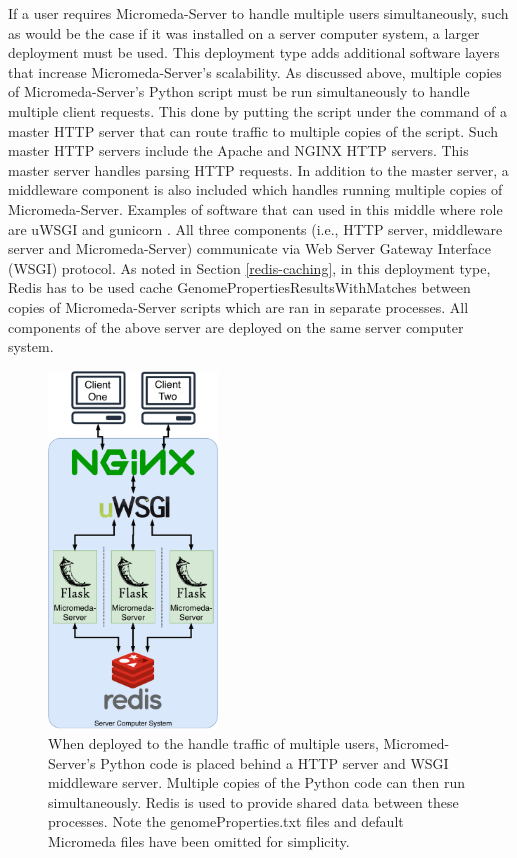 If a user requires Micromeda-Server to handle multiple users simultaneously, such as would be the case if it was installed on a server computer system, a larger deployment must be used. This deployment type adds additional software layers that increase Micromeda-Server's scalability. As discussed above, multiple copies of Micromeda-Server's Python script must be run simultaneously to handle multiple client requests. This done by putting the script under the command of a master HTTP server that can route traffic to multiple copies of the script. Such master HTTP servers include the Apache \cite{fielding1997apache} and NGINX \cite{reese2008nginx} HTTP servers. This master server handles parsing HTTP requests. In addition to the master server, a middleware component is also included which handles running multiple copies of Micromeda-Server. Examples of software that can used in this middle where role are uWSGI \cite{2019uwsgi} and gunicorn \cite{chesneau_2018}. All three components (i.e., HTTP server, middleware server and Micromeda-Server) communicate via Web Server Gateway Interface (WSGI) protocol. As noted in Section \ref{redis-caching}, in this deployment type, Redis has to be used cache GenomePropertiesResultsWithMatches between copies of Micromeda-Server scripts which are ran in separate processes. All components of the above server are deployed on the same server computer system.

\begin{figure}[!ht]
  \centering
	\includegraphics[width=0.40\textwidth]{media/micromeda-medium-deployment.pdf}
	 \caption{When deployed to the handle traffic of multiple users, Micromed-Server's Python code is placed behind a HTTP server and WSGI middleware server. Multiple copies of the Python code can then run simultaneously. Redis is used to provide shared data between these processes. Note the genomeProperties.txt files and default Micromeda files have been omitted for simplicity.}
	 \label{fig:micromeda-medium-deploy}
\end{figure}

